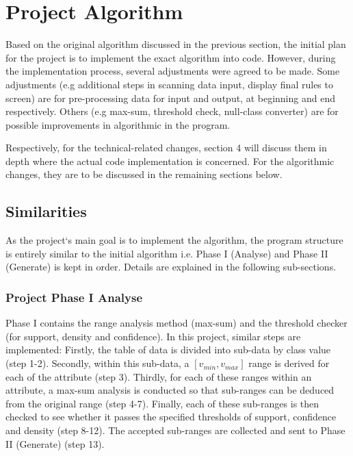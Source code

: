 \chapter{Project Algorithm}

Based on the original algorithm discussed in the previous section, the initial plan for the project is to implement the exact algorithm into code. However, during the implementation process, several adjustments were agreed to be made. Some adjustments (e.g additional steps in scanning data input, display final rules to screen) are for pre-processing data for input and output, at beginning and end respectively. Others (e.g max-sum, threshold check, null-class converter) are for possible improvements in algorithmic in the program. 

Respectively, for the technical-related changes, section 4 will discuss them in depth where the actual code implementation is concerned. For the algorithmic changes, they are to be discussed in the remaining sections below.

\section{Similarities}

As the project`s main goal is to implement the algorithm, the program structure is entirely similar to the initial algorithm i.e. Phase I (Analyse) and Phase II (Generate) is kept in order. Details are explained in the following sub-sections. \\


\subsection{Project Phase I Analyse}

Phase I contains the range analysis method (max-sum) and the threshold checker (for support, density and confidence). In this project, similar steps are implemented: Firstly, the table of data is divided into sub-data by class value (step 1-2). Secondly, within this sub-data, a $[v_{min}, v_{max}]$ range is derived for each of the attribute (step 3). Thirdly, for each of these ranges within an attribute, a max-sum analysis is conducted so that sub-ranges can be deduced from the original range (step 4-7). Finally, each of these sub-ranges is then checked to see whether it passes the specified thresholds of support, confidence and density (step 8-12). The accepted sub-ranges are collected and sent to Phase II (Generate) (step 13).

